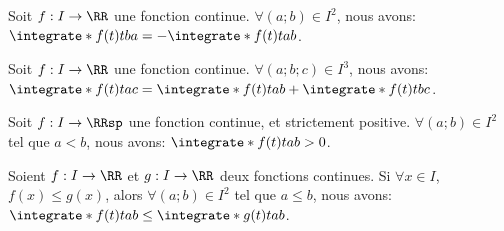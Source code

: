 \begin{fact} \label{int-dir}
    Soit $f: I \to \RR$ une fonction continue.
    $\forall(a;b) \in I^2$,
    nous avons:
    $\integrate*{f(t)}{t}{b}{a} = - \integrate*{f(t)}{t}{a}{b}$.
\end{fact}




\begin{fact} \label{int-rdc}
    Soit $f: I \to \RR$ une fonction continue.
    $\forall(a;b;c) \in I^3$,
    nous avons:
    $\integrate*{f(t)}{t}{a}{c} = \integrate*{f(t)}{t}{a}{b} + \integrate*{f(t)}{t}{b}{c}$.
\end{fact}




\begin{fact} \label{int-pos}
    Soit $f: I \to \RRsp$ une fonction continue, et strictement positive.
    $\forall(a;b) \in I^2$ tel que $a < b$,
    nous avons:
    $\integrate*{f(t)}{t}{a}{b} > 0$.
\end{fact}




\begin{fact} \label{int-mono}
    Soient $f: I \to \RR$ et $g: I \to \RR$ deux fonctions continues.
    Si $\forall x \in I$, $f(x) \leq g(x)$,
    alors
    $\forall(a;b) \in I^2$ tel que $a \leq b$,
    nous avons:
    $\integrate*{f(t)}{t}{a}{b} \leq \integrate*{g(t)}{t}{a}{b}$.
\end{fact}
